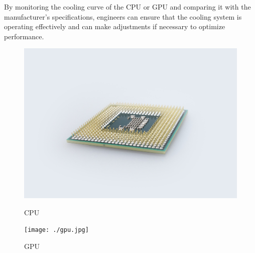 \documentclass[12pt, a4paper]{article}
\begin{document}
By monitoring the cooling curve of the CPU or GPU and comparing it with the manufacturer's specifications, engineers can ensure that the cooling system is operating effectively and can make adjustments if necessary to optimize performance.

\begin{figure}[h]
    \centering
    \begin{minipage}[b]{0.45\textwidth}
        \includegraphics[width=\textwidth]{./cpu.jpg}
        \caption{CPU}
    \end{minipage}
    \hfill
    \begin{minipage}[b]{0.45\textwidth}
        \texttt{[image: ./gpu.jpg]}
        \caption{GPU}
    \end{minipage}
\end{figure}
\end{document}
